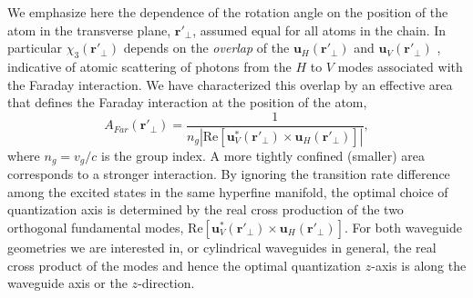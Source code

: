 \documentclass[preprint,aps,pra,onecolumn,superscriptaddress]{revtex4-1} %
\newcommand{\mbf}[1]{\mathbf{#1}}
\begin{document}
We emphasize here the dependence of the rotation angle on the position of the atom in the transverse plane, $\mbf{r}'_\perp$, assumed equal for all atoms in the chain.  In particular $\chi_3(\mbf{r}'_\perp)$ depends on the {\em overlap} of the $\mbf{u}_H (\mbf{r}'_\perp)$ and $\mbf{u}_V (\mbf{r}'_\perp)$ , indicative of atomic scattering of photons from the $H$ to $V$ modes associated with the Faraday interaction.  We have characterized this overlap by an effective area that defines the Faraday interaction at the position of the atom,
\begin{equation}
A_{Far}(\mbf{r}'_\perp) = \frac{1}{n_g \left\vert \text{Re} \left[ \mbf{u}^*_V (\mbf{r}'_\perp) \times \mbf{u}_H (\mbf{r}'_\perp) \right]\right\vert},
\end{equation}
where $n_g = v_g/c$ is the group index.  A more tightly confined (smaller) area corresponds to a stronger interaction.
By ignoring the transition rate difference among the excited states in the same hyperfine manifold, the optimal choice of quantization axis is determined by the real cross production of the two orthogonal fundamental modes, $ \text{Re} \left[ \mbf{u}^*_V (\mbf{r}'_\perp) \times \mbf{u}_H (\mbf{r}'_\perp) \right] $.
For both waveguide geometries we are interested in, or cylindrical waveguides in general, the real cross product of the modes and hence the optimal quantization $ z $-axis is along the waveguide axis or the $ z $-direction.
\end{document}
